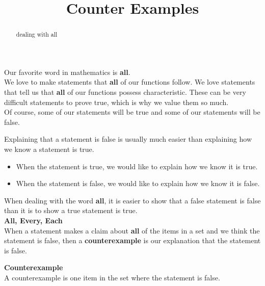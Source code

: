 \documentclass{ximera}
\title{Counter Examples}
\begin{document}
\begin{abstract}
dealing with all
\end{abstract}
\maketitle




Our favorite word in mathematics is \textbf{\textcolor{blue!55!black}{all}}. \\


We love to make statements that \textbf{all} of our functions follow. We love statements that tell us that \textbf{all} of our functions possess characteristic. These can be very difficult statements to prove true, which is why we value them so much. \\


Of course, some of our statements will be true and some of our statements will be false.

Explaining that a statement is false is usually much easier than explaining how we know a statement is true.


\begin{itemize}
\item When the statement is true, we would like to explain how we know it is true.
\item When the statement is false, we would like to explain how we know it is false.
\end{itemize}



When dealing with the word \textbf{all}, it is easier to show that a false statement is false than it is to show a true statement is true. \\


\textbf{\textcolor{blue!55!black}{All, Every, Each}} \\

When a statement makes a claim about \textbf{\textcolor{red!70!black}{all}} of the items in a set and we think the statement is false, then a \textbf{counterexample} is our explanation that the statement is false.



\begin{definition}  \textbf{\textcolor{green!50!black}{Counterexample}} \\


A counterexample is one item in the set where the statement is false.


\end{definition}
\end{document}
